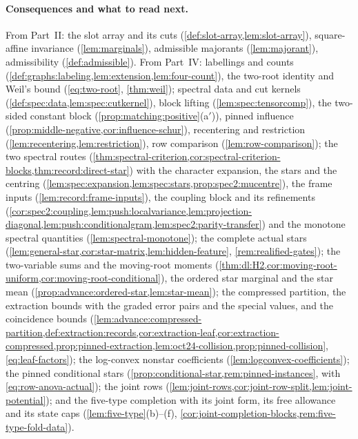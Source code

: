 \paragraph{Consequences and what to read next.}
From Part~II: the slot array and its cuts (\cref{def:slot-array,lem:slot-array}),
square-affine invariance (\cref{lem:marginals}), admissible majorants
(\cref{lem:majorant}), admissibility (\cref{def:admissible}). From Part~IV: labellings
and counts (\cref{def:graphs:labeling,lem:extension,lem:four-count}), the two-root
identity and Weil's bound (\eqref{eq:two-root}, \cref{thm:weil}); spectral data and cut
kernels (\cref{def:spec:data,lem:spec:cutkernel}), block lifting
(\cref{lem:spec:tensorcomp}), the two-sided constant block
(\cref{prop:matching:positive}(a$'$)), pinned influence
(\cref{prop:middle-negative,cor:influence-schur}), recentering and restriction
(\cref{lem:recentering,lem:restriction}), row comparison (\cref{lem:row-comparison}); the
two spectral routes (\cref{thm:spectral-criterion,cor:spectral-criterion-blocks,thm:record:direct-star})
with the character expansion, the stars and the centring
(\cref{lem:spec:expansion,lem:spec:stars,prop:spec2:mucentre}), the frame inputs
(\cref{lem:record:frame-inputs}), the coupling block and its refinements
(\cref{cor:spec2:coupling,lem:push:localvariance,lem:projection-diagonal,lem:push:conditionalgram,lem:spec2:parity-transfer})
and the monotone spectral quantities (\cref{lem:spectral-monotone}); the complete actual
stars (\cref{lem:general-star,cor:star-matrix,lem:hidden-feature},
\cref{rem:realified-gates}); the two-variable sums and the moving-root moments
(\cref{thm:dl:H2,cor:moving-root-uniform,cor:moving-root-conditional}), the ordered star
marginal and the star mean (\cref{prop:advance:ordered-star,lem:star-mean}); the
compressed partition, the extraction bounds with the graded error pairs and the special
values, and the coincidence bounds
(\cref{lem:advance:compressed-partition,def:extraction:records,cor:extraction-leaf,cor:extraction-compressed,prop:pinned-extraction,lem:oct24-collision,prop:pinned-collision},
\eqref{eq:leaf-factors}); the log-convex nonstar coefficients
(\cref{lem:logconvex-coefficients}); the pinned conditional stars
(\cref{prop:conditional-star,rem:pinned-instances}, with \eqref{eq:row-anova-actual});
the joint rows (\cref{lem:joint-rows,cor:joint-row-split,lem:joint-potential}); and the
five-type completion with its joint form, its free allowance and its state caps
(\cref{lem:five-type}(b)--(f), \cref{cor:joint-completion-blocks,rem:five-type-fold-data}).


